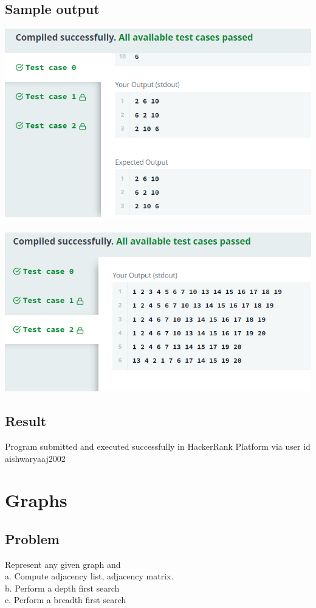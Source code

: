 \documentclass[14pt, letterpaper]{article}
\begin{document}
\subsection{Sample output}
\includegraphics[width=\textwidth]{images/bst1.png}\\ \\
\includegraphics[width=\textwidth]{images/bst2.png}
\subsection{Result}
Program submitted and executed successfully in HackerRank Platform via user id\\ aishwaryaaj2002
\newpage
\section{Graphs}

\subsection{Problem}
Represent any given graph and\\
a. Compute adjacency list, adjacency matrix.\\
b. Perform a depth first search\\
c. Perform a breadth first search
\end{document}
